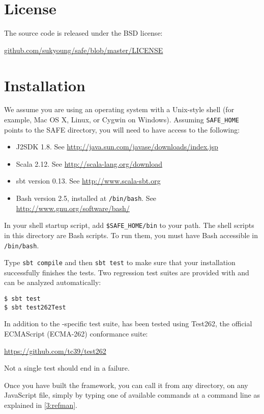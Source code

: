 \section{License}
The \safe source code is released under the BSD license:
\begin{center}
\url{github.com/sukyoung/safe/blob/master/LICENSE}
\end{center}


\section{Installation}
We assume you are using an operating system with a Unix-style shell
(for example, Mac OS X, Linux, or Cygwin on Windows).
Assuming \verb!SAFE_HOME! points to the SAFE directory,
you will need to have access to the following:
\begin{itemize}
\item J2SDK 1.8.  See
\url{http://java.sun.com/javase/downloads/index.jsp}
\item Scala 2.12.  See
\url{http://scala-lang.org/download}
\item sbt version 0.13.  See
\url{http://www.scala-sbt.org}
\item Bash version 2.5, installed at \verb!/bin/bash!.  See
\url{http://www.gnu.org/software/bash/}
\end{itemize}

In your shell startup script, add \verb!$SAFE_HOME/bin! to your path.
The shell scripts in this directory are Bash scripts.
To run them, you must have Bash accessible in \verb!/bin/bash!.

Type \verb!sbt compile! and then \verb!sbt test! to make sure that
your installation successfully finishes the tests.
Two regression test suites are provided with \safe and can be
analyzed automatically:
\begin{verbatim}
$ sbt test
$ sbt test262Test
\end{verbatim}
In addition to the \safe-specific test suite,
 has been tested using Test262, the official ECMAScript (ECMA-262) conformance suite:
\begin{center}
\url{https://github.com/tc39/test262}
\end{center}
Not a single test should end in a failure.

Once you have built the framework, you can call it from any directory,
on any JavaScript file, simply by typing one of available commands at a command line
as explained in \cref{3:refman}.

